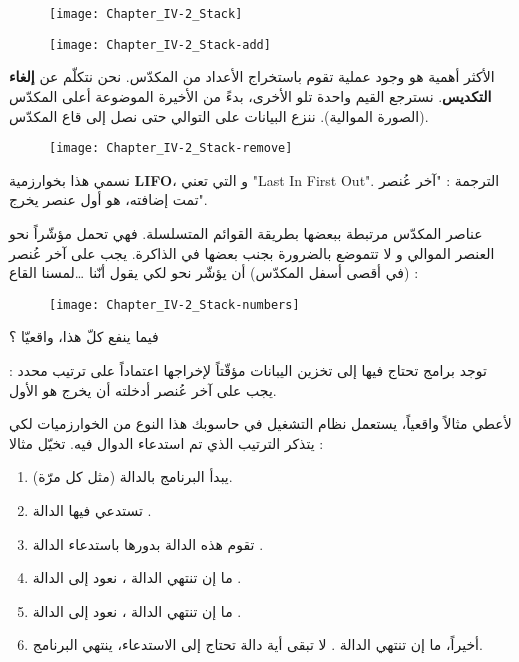 \begin{figure}[H]
	\centering
	\texttt{[image: Chapter\_IV-2\_Stack]}
\end{figure}
\begin{figure}[H]
	\centering
	\texttt{[image: Chapter\_IV-2\_Stack-add]}
\end{figure}

الأكثر أهمية هو وجود عملية تقوم باستخراج الأعداد من المكدّس. نحن نتكلّم عن
\textbf{إلغاء التكديس}.
نسترجع القيم واحدة تلو الأخرى، بدءً من الأخيرة الموضوعة أعلى المكدّس (الصورة الموالية). ننزع البيانات على التوالي حتى نصل إلى قاع المكدّس.

\begin{figure}[H]
	\centering
	\texttt{[image: Chapter\_IV-2\_Stack-remove]}
\end{figure}

نسمي هذا بخوارزمية
\textbf{\textenglish{LIFO}}،
و التي تعني
"\textenglish{Last In First Out}".
الترجمة : "آخر عُنصر تمت إضافته، هو أول عنصر يخرج".

عناصر المكدّس مرتبطة ببعضها بطريقة القوائم المتسلسلة. فهي تحمل مؤشّراً نحو العنصر الموالي و لا تتموضع بالضرورة بجنب بعضها في الذاكرة. يجب على آخر عُنصر (في أقصى أسفل المكدّس) أن يؤشّر نحو
لكي يقول أنّنا \dots لمسنا القاع :

\begin{figure}[H]
	\centering
	\texttt{[image: Chapter\_IV-2\_Stack-numbers]}
\end{figure}

\begin{question}
 فيما ينفع كلّ هذا، واقعيّا ؟
\end{question}

توجد برامج تحتاج فيها إلى تخزين اليبانات مؤقّتاً لإخراجها اعتماداً على ترتيب محدد : يجب على آخر عُنصر أدخلته أن يخرج هو الأول.

لأعطي مثالاً واقعياً، يستعمل نظام التشغيل في حاسوبك هذا النوع من الخوارزميات لكي يتذكر الترتيب الذي تم استدعاء الدوال فيه. تخيّل مثالا :

\begin{enumerate}
	\item يبدأ البرنامج بالدالة
	(مثل كل مرّة).
	\item تستدعي فيها الدالة 
	.
	\item تقوم هذه الدالة 
	بدورها باستدعاء الدالة
	.
	\item ما إن تنتهي الدالة
	،
	نعود إلى الدالة
	.
	\item ما إن تنتهي الدالة 
	،
	نعود إلى الدالة 
	.
	\item أخيراً، ما إن تنتهي الدالة
	.
	لا تبقى أية دالة تحتاج إلى الاستدعاء، ينتهي البرنامج.
\end{enumerate}


